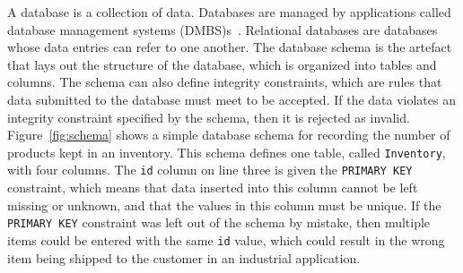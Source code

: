 A database is a collection of data. Databases
are managed by applications called database management systems (DMBS)s~\cite{databasebook}.
Relational databases are databases whose data entries can refer to one another. The database schema
is the artefact that lays out the structure of the database, which is organized into tables and columns.
The schema can also define integrity constraints, which are rules that data submitted to the database must
meet to be accepted. If the data violates an integrity constraint specified by the schema, then it is rejected as
invalid. Figure~\ref{fig:schema} shows a simple database schema for recording the number of products
kept in an inventory. This schema defines one table, called \texttt{Inventory}, with four columns.
The \texttt{id} column on line three is given the \texttt{PRIMARY KEY} constraint, which means that
data inserted into this column cannot be left missing or unknown, and that the values in this column
must be unique. If the \texttt{PRIMARY KEY} constraint was left out of the schema by mistake, then multiple
items could be entered with the same \texttt{id} value, which could result in the wrong item being shipped
to the customer in an industrial application. 
